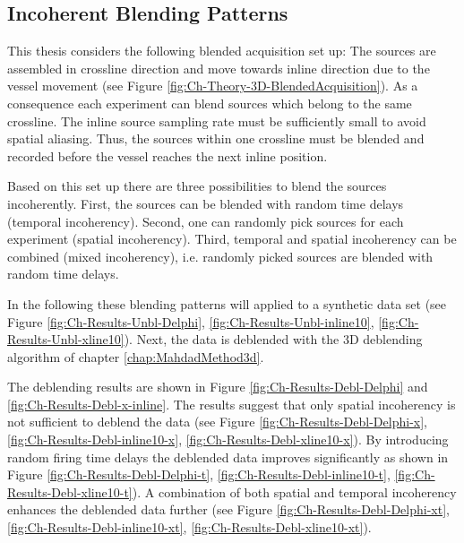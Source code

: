 \subsection*{Incoherent Blending Patterns}

This thesis considers the following blended acquisition set up: The sources are assembled in crossline direction and move towards inline direction due to the vessel movement (see Figure \ref{fig:Ch-Theory-3D-BlendedAcquisition}). As a consequence each experiment can blend sources which belong to the same crossline. The inline source sampling rate must be sufficiently small to avoid spatial aliasing. Thus, the sources within one crossline must be blended and recorded before the vessel reaches the next inline position.

Based on this set up there are three possibilities to blend the sources incoherently. First, the sources can be blended with random time delays (temporal incoherency). Second, one can randomly pick sources for each experiment (spatial incoherency). Third, temporal and spatial incoherency can be combined (mixed incoherency), i.e. randomly picked sources are blended with random time delays.

In the following these blending patterns will applied to a synthetic data set (see Figure \ref{fig:Ch-Results-Unbl-Delphi}, \ref{fig:Ch-Results-Unbl-inline10}, \ref{fig:Ch-Results-Unbl-xline10}). Next, the data is deblended with the 3D deblending algorithm of chapter \ref{chap:MahdadMethod3d}. 

The deblending results are shown in Figure \ref{fig:Ch-Results-Debl-Delphi} and \ref{fig:Ch-Results-Debl-x-inline}. The results suggest that only spatial incoherency is not sufficient to deblend the data (see Figure \ref{fig:Ch-Results-Debl-Delphi-x}, \ref{fig:Ch-Results-Debl-inline10-x}, \ref{fig:Ch-Results-Debl-xline10-x}). By introducing random firing time delays the deblended data improves significantly as shown in Figure \ref{fig:Ch-Results-Debl-Delphi-t}, \ref{fig:Ch-Results-Debl-inline10-t}, \ref{fig:Ch-Results-Debl-xline10-t}). A combination of both spatial and temporal incoherency enhances the deblended data further (see Figure \ref{fig:Ch-Results-Debl-Delphi-xt}, \ref{fig:Ch-Results-Debl-inline10-xt}, \ref{fig:Ch-Results-Debl-xline10-xt}).

